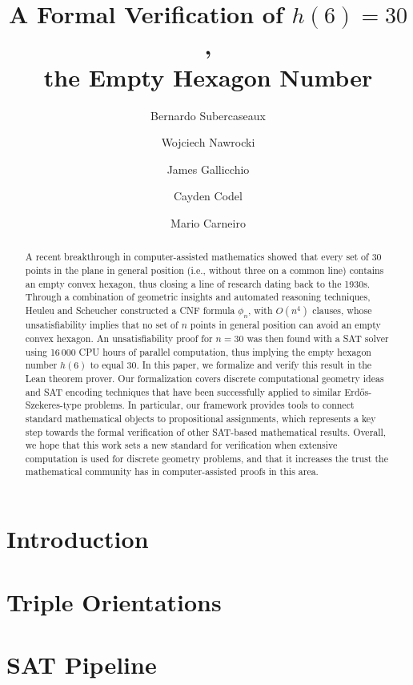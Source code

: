 \documentclass[a4paper, USenglish, cleveref, autoref, thm-restate]{lipics-v2021}
\title{\texorpdfstring{A Formal Verification of $h(6) = 30$,\\ the Empty Hexagon Number}{A Formal Verification of the Empty Hexagon Number}}%
\author{Bernardo {Subercaseaux}}{Carnegie Mellon University}{bsuberca@andrew.cmu.edu}{https://orcid.org/0000-0003-2295-1299}{}
\author{Wojciech {Nawrocki}}{Carnegie Mellon University}{wnawrock@andrew.cmu.edu}{https://orcid.org/0000-0002-8839-0618}{}
\author{James {Gallicchio}}{Carnegie Mellon University}{jgallicc@andrew.cmu.edu}{https://orcid.org/0000-0002-0838-3240}{}
\author{Cayden {Codel}}{Carnegie Mellon University}{ccodel@andrew.cmu.edu}{https://orcid.org/0000-0003-3588-4873}{}
\author{Mario {Carneiro}}{Carnegie Mellon University}{mcarneir@andrew.cmu.edu}{https://orcid.org/0000-0002-0470-5249}{}
\begin{document}
\maketitle

\begin{abstract}
  A recent breakthrough in computer-assisted mathematics showed that every set of $30$ points in the plane in general position (i.e., without three on a common line) contains an empty convex hexagon, thus closing a line of research dating back to the 1930s.
  Through a combination of geometric insights and automated reasoning techniques, Heuleu and Scheucher constructed a CNF formula $\phi_n$, with $O(n^4)$ clauses, whose unsatisfiability implies that no set of $n$ points in general position can avoid an empty convex hexagon.
  An unsatisfiability proof for $n = 30$ was then found with a SAT solver using 16\,000 CPU hours of parallel computation, thus implying the empty hexagon number $h(6)$ to equal 30.
  In this paper, we formalize and verify this result in the Lean theorem prover. Our formalization covers discrete computational geometry ideas and SAT encoding techniques that have been successfully applied to similar Erd\H{o}s-Szekeres-type problems.
  In particular, our framework provides tools to connect standard mathematical objects to propositional assignments, which represents a key step towards the formal verification of other SAT-based mathematical results.
  Overall, we hope that this work sets a new standard for verification when extensive computation is used for discrete geometry problems, and that it increases the trust the mathematical community has in computer-assisted proofs in this area.
\end{abstract}

 
\section{Introduction}\label{sec:intro}


\section{Triple Orientations}\label{sec:triple-orientations}


\section{SAT Pipeline}\label{sec:leansat}

\end{document}

